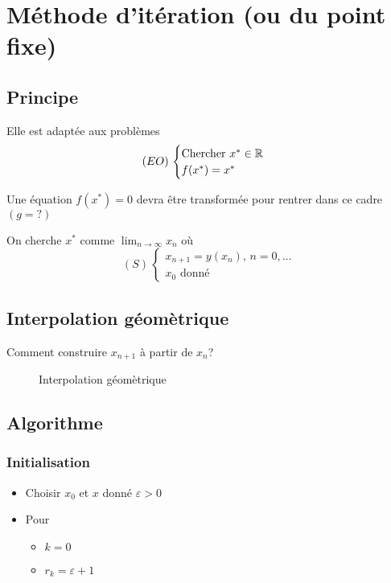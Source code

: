 \section{Méthode d'itération (ou du point fixe)}
\subsection{Principe}
Elle est adaptée aux problèmes
\[
    (EO) \, \begin{cases}
    \text{Chercher } x^* \in \mathbb{R}\\
    f(x^*) = x^*
\end{cases}
\] 
\begin{remark}
   Une équation $f(x^*) = 0$ devra être transformée pour rentrer dans ce cadre $(g = ?)$ \par
   On cherche $x^*$ comme  $\lim_{n \to \infty} x_n$ où 
   \[
       (S) \, \begin{cases}
           x_{n+1} = y(x_n), \, n = 0, \ldots \\
           x_0 \text{ donné }
       \end{cases}
   \] 
\end{remark}

\subsection{Interpolation géomètrique}
Comment construire $x_{n+1}$ à partir de $x_n$? 

\begin{figure}[H]
    \centering
    \caption{Interpolation géomètrique}
    \label{fig:interpolation-geometrique}
\end{figure}

\subsection{Algorithme}
\subsubsection*{Initialisation}
\begin{itemize}
    \item Choisir $x_0$ et $x$ donné  $\varepsilon > 0$
    \item Pour  
        \begin{itemize}
            \item $k = 0$
            \item  $r_k = \varepsilon + 1$
        \end{itemize}
\end{itemize}
